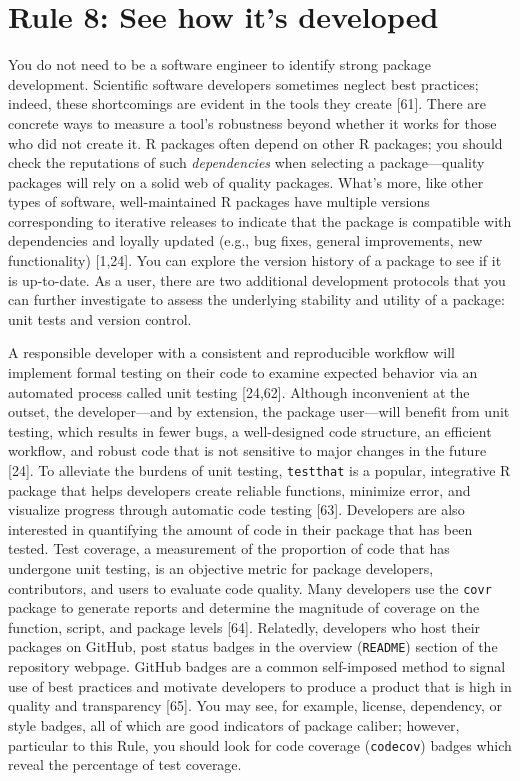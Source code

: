 \documentclass[10pt,letterpaper]{article}
\begin{document}
\hypertarget{rule-8-see-how-its-developed}{%
\section{Rule 8: See how it's
developed}\label{rule-8-see-how-its-developed}}

You do not need to be a software engineer to identify strong package
development. Scientific software developers sometimes neglect best
practices; indeed, these shortcomings are evident in the tools they
create {[}61{]}. There are concrete ways to measure a tool's robustness
beyond whether it works for those who did not create it. R packages
often depend on other R packages; you should check the reputations of
such \emph{dependencies} when selecting a package---quality packages
will rely on a solid web of quality packages. What's more, like other
types of software, well-maintained R packages have multiple versions
corresponding to iterative releases to indicate that the package is
compatible with dependencies and loyally updated (e.g., bug fixes,
general improvements, new functionality) {[}1,24{]}. You can explore the
version history of a package to see if it is up-to-date. As a user,
there are two additional development protocols that you can further
investigate to assess the underlying stability and utility of a package:
unit tests and version control.

A responsible developer with a consistent and reproducible workflow will
implement formal testing on their code to examine expected behavior via
an automated process called unit testing {[}24,62{]}. Although
inconvenient at the outset, the developer---and by extension, the
package user---will benefit from unit testing, which results in fewer
bugs, a well-designed code structure, an efficient workflow, and robust
code that is not sensitive to major changes in the future {[}24{]}. To
alleviate the burdens of unit testing, \texttt{testthat} is a popular,
integrative R package that helps developers create reliable functions,
minimize error, and visualize progress through automatic code testing
{[}63{]}. Developers are also interested in quantifying the amount of
code in their package that has been tested. Test coverage, a measurement
of the proportion of code that has undergone unit testing, is an
objective metric for package developers, contributors, and users to
evaluate code quality. Many developers use the \texttt{covr} package to
generate reports and determine the magnitude of coverage on the
function, script, and package levels {[}64{]}. Relatedly, developers who
host their packages on GitHub, post status badges in the overview
(\texttt{README}) section of the repository webpage. GitHub badges are a
common self-imposed method to signal use of best practices and motivate
developers to produce a product that is high in quality and transparency
{[}65{]}. You may see, for example, license, dependency, or style
badges, all of which are good indicators of package caliber; however,
particular to this Rule, you should look for code coverage
(\texttt{codecov}) badges which reveal the percentage of test coverage.
\end{document}
